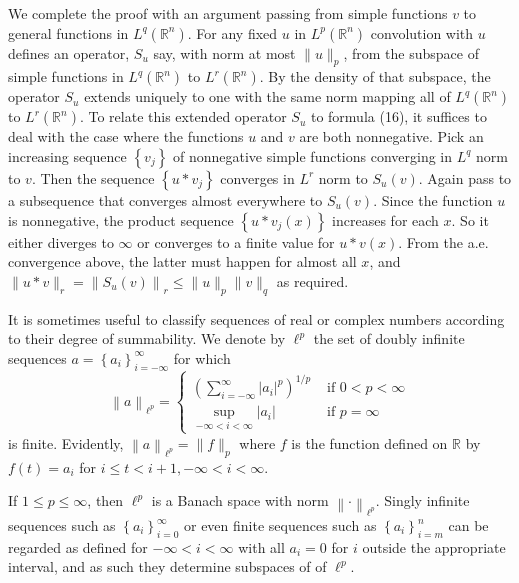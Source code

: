 \begin{para}
  We complete the proof with an argument passing from simple functions $v$ to general functions in $L^q(\mathbb{R}^n)$. For any fixed $u$ in $L^p(\mathbb{R}^n)$ convolution with $u$ defines an operator, $S_u$ say, with norm at most $\|u\|_p$, from the subspace of simple functions in $L^q(\mathbb{R}^n)$ to $L^r(\mathbb{R}^n)$. By the density of that subspace, the operator $S_u$ extends uniquely to one with the same norm mapping all of $L^q(\mathbb{R}^n)$ to $L^r(\mathbb{R}^n)$.
  To relate this extended operator $S_u$ to formula (16), it suffices to deal with the case where the functions $u$ and $v$ are both nonnegative. Pick an increasing sequence $\left\{v_j\right\}$ of nonnegative simple functions converging in $L^q$ norm to $v$. Then the sequence $\left\{u * v_j\right\}$ converges in $L^r$ norm to $S_u(v)$. Again pass to a subsequence
  that converges almost everywhere to $S_u(v)$. Since the function $u$ is nonnegative, the product sequence $\left\{u * v_j(x)\right\}$ increases for each $x$. So it either diverges to $\infty$ or converges to a finite value for $u * v(x)$. From the a.e. convergence above, the latter must happen for almost all $x$, and $\|u * v\|_r=\left\|S_u(v)\right\|_r \leq\|u\|_p\|v\|_q$ as required.
\end{para}

\begin{para}
  It is sometimes useful to classify sequences of real or complex numbers according to their degree of summability. We denote by $\ell^p$ the set of doubly infinite sequences $a=\left\{a_i\right\}_{i=-\infty}^{\infty}$ for which
  \[
  \left\|a\right\|_{\ell^p}= \begin{cases}\left(\sum_{i=-\infty}^{\infty}\left|a_i\right|^p\right)^{1 / p} & \text { if } 0<p<\infty \\ \sup _{-\infty<i<\infty}\left|a_i\right| & \text { if } p=\infty\end{cases}
  \]
  is finite. Evidently, $\left\|a\right\|_{\ell^p}=\|f\|_p$ where $f$ is the function defined on $\mathbb{R}$ by $f(t)=a_i$ for $i \leq t<i+1,-\infty<i<\infty$.
  
  If $1 \leq p \leq \infty$, then $\ell^p$ is a Banach space with norm $\left\|\cdot\right\|_{\ell^p}$. Singly infinite sequences such as $\left\{a_i\right\}_{i=0}^{\infty}$ or even finite sequences such as $\left\{a_i\right\}_{i=m}^n$ can be regarded as defined for $-\infty<i<\infty$ with all $a_i=0$ for $i$ outside the appropriate interval, and as such they determine subspaces of of $\ell^p$.
\end{para}

